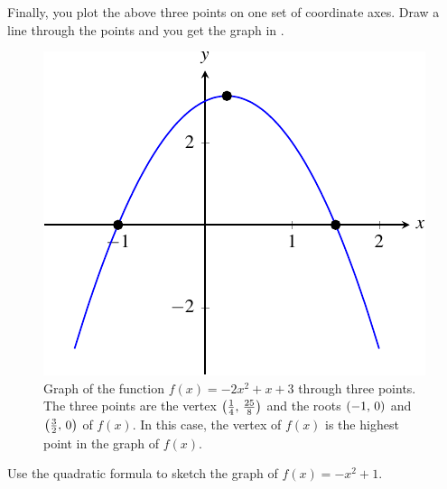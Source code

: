 \documentclass[a4paper,oneside,12pt]{article}
\begin{document}
{\begin{solution}
Finally, you plot the above three points on one set of coordinate
axes.  Draw a line through the points and you get the graph in
.

\begin{figure}[!htbp]
\centering
\includegraphics[scale=1]{image/07/aminus2-b1-c3.pdf}
\caption{%
  Graph of the function $f(x) = -2x^2 + x + 3$ through three points.
  The three points are the vertex $\left\lparen{\frac{1}{4}},\, {\frac{25}{8}}\right\rparen$
  and the roots $\left\lparen{-1},\, {0}\right\rparen$ and $\left\lparen{\frac{3}{2}},\, {0}\right\rparen$ of
  $f(x)$.  In this case, the vertex of $f(x)$ is the highest point in
  the graph of $f(x)$.
}
\label{fig:aminus2_b1_c3}
\end{figure}
\end{solution}
}{}

\begin{exercise}
Use the quadratic formula to sketch the graph of $f(x) = -x^2 + 1$.
\end{exercise}
\end{document}
